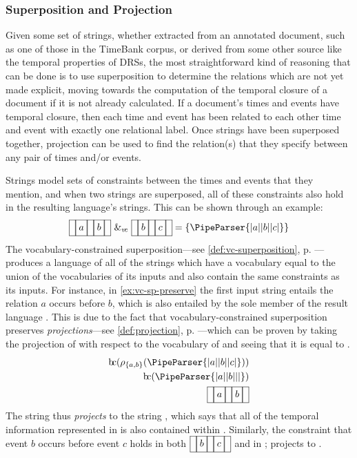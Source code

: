 \documentclass[a4paper,12pt,leqno,twoside]{article}
\newcommand{\bc}{{\rm b\!c}}
\newcommand{\vph}[1]{\vphantom{#1}}
\newcommand{\ebox}[1]{\fbox{$\vph{'(),}#1$}}
\newcommand{\nbBefore}[2]{\ebox{#1}\ebox{}\ebox{#2}}
\newcommand{\Before}[2]{\ebox{}\nbBefore{#1}{#2}\ebox{}}
\newcommand{\spvc}{~\&_{v\!c}~}
\newcommand{\EventString}[1]{%
	\renewcommand*{\do}[1]{\ebox{##1}}%
	\PipeParser{#1}%
}
\begin{document}
\subsubsection{Superposition and Projection}\label{ssub:superposition}
Given some set of strings, whether extracted from an annotated document, such as one of those in the TimeBank \citep{pustejovsky2006timebank} corpus, or derived from some other source like the temporal properties of DRSs, the most straightforward kind of reasoning that can be done is to use superposition to determine the relations which are not yet made explicit, moving towards the computation of the temporal closure of a document if it is not already calculated. If a document's times and events have temporal closure, then each time and event has been related to each other time and event with exactly one relational label. Once strings have been superposed together, projection can be used to find the relation(s) that they specify between any pair of times and/or events.

Strings model sets of constraints between the times and events that they mention, and when two strings are superposed, all of these constraints also hold in the resulting language's strings. This can be shown through an example:
\begin{align}
	\Before{a}{b} \spvc \Before{b}{c} = \{\EventString{{}|a|{}|b|{}|c|{}}\}\label{ex:vc-sp-preserve}
\end{align}
The vocabulary-constrained superposition---see \cref{def:vc-superposition}, p. \pageref{def:vc-superposition}---produces a language of all of the strings which have a vocabulary equal to the union of the vocabularies of its inputs and also contain the same constraints as its inputs. For instance, in \cref{ex:vc-sp-preserve} the first input string \Before{a}{b} entails the relation $a$ occurs before $b$, which is also entailed by the sole member of the result language \EventString{{}|a|{}|b|{}|c|{}}. This is due to the fact that vocabulary-constrained superposition preserves \textit{projections}---see \cref{def:projection}, p. \pageref{def:projection}---which can be proven by taking the projection of \EventString{{}|a|{}|b|{}|c|{}} with respect to the vocabulary of \EventString{{}|a|{}|b|{}} and seeing that it is equal to \EventString{{}|a|{}|b|{}}.
\begin{align}
\bc(\rho_{\{a,b\}}(\EventString{{}|a|{}|b|{}|c|{}}))\\ \notag
\bc(\EventString{{}|a|{}|b|{}|{}|{}})\\ \notag
\Before{a}{b}
\end{align}
The string \EventString{{}|a|{}|b|{}|c|{}} thus \textit{projects} to the string \EventString{{}|a|{}|b|{}}, which says that all of the temporal information represented in \EventString{{}|a|{}|b|{}} is also contained within \EventString{{}|a|{}|b|{}|c|{}}. Similarly, the constraint that event $b$ occurs before event $c$ holds in both $\Before{b}{c}$ and in \EventString{{}|a|{}|b|{}|c|{}}; \EventString{{}|a|{}|b|{}|c|{}} projects to \EventString{{}|b|{}|c|{}}.
\end{document}
